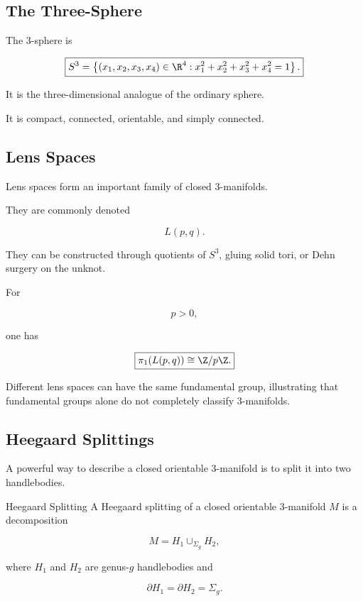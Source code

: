 \subsection{The Three-Sphere}
\label{subsec:three-sphere-low-dimensional}

The \(3\)-sphere is

\[
\boxed{
S^3
=
\left\{
(x_1,x_2,x_3,x_4)\in\R^4:
x_1^2+x_2^2+x_3^2+x_4^2=1
\right\}.
}
\]

It is the three-dimensional analogue of the ordinary sphere.

It is compact, connected, orientable, and simply connected.

\subsection{Lens Spaces}
\label{subsec:lens-spaces}

Lens spaces form an important family of closed \(3\)-manifolds.

They are commonly denoted

\[
\boxed{
L(p,q).
}
\]

They can be constructed through quotients of \(S^3\), gluing solid tori, or
Dehn surgery on the unknot.

For

\[
p>0,
\]

one has

\[
\boxed{
\pi_1(L(p,q))
\cong
\Z/p\Z.
}
\]

Different lens spaces can have the same fundamental group, illustrating that
fundamental groups alone do not completely classify \(3\)-manifolds.

\subsection{Heegaard Splittings}
\label{subsec:heegaard-splittings}

A powerful way to describe a closed orientable \(3\)-manifold is to split it
into two handlebodies.

\begin{definitionbox}{Heegaard Splitting}
A Heegaard splitting of a closed orientable \(3\)-manifold \(M\) is a
decomposition

\[
\boxed{
M=H_1\cup_{\Sigma_g}H_2,
}
\]

where \(H_1\) and \(H_2\) are genus-\(g\) handlebodies and

\[
\partial H_1
=
\partial H_2
=
\Sigma_g.
\]
\end{definitionbox}

